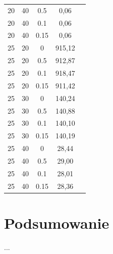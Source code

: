 \documentclass{article}
\begin{document}
\begin{longtable}{c|c|c|c|c}
20     & 40   & 0.5   & 0,06   \\
20     & 40   & 0.1   & 0,06   \\
20     & 40   & 0.15  & 0,06   \\
25     & 20   & 0     & 915,12 \\
25     & 20   & 0.5   & 912,87 \\
25     & 20   & 0.1   & 918,47 \\
25     & 20   & 0.15  & 911,42 \\
25     & 30   & 0     & 140,24 \\
25     & 30   & 0.5   & 140,88 \\
25     & 30   & 0.1   & 140,10 \\
25     & 30   & 0.15  & 140,19 \\
25     & 40   & 0     & 28,44  \\
25     & 40   & 0.5   & 29,00  \\
25     & 40   & 0.1   & 28,01  \\
25     & 40   & 0.15  & 28,36 
\end{longtable}


\section{Podsumowanie}

...
\end{document}
